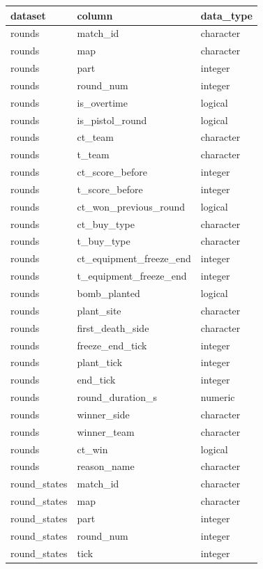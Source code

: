 \documentclass[
  letterpaper,
  DIV=11,
  numbers=noendperiod]{scrartcl}
\newcounter{none} %
\begin{document}
{\def\LTcaptype{none} %
\begin{longtable}[]{@{}lll@{}}
\toprule\noalign{}
dataset & column & data\_type \\
\midrule\noalign{}
\endhead
\bottomrule\noalign{}
\endlastfoot
rounds & match\_id & character \\
rounds & map & character \\
rounds & part & integer \\
rounds & round\_num & integer \\
rounds & is\_overtime & logical \\
rounds & is\_pistol\_round & logical \\
rounds & ct\_team & character \\
rounds & t\_team & character \\
rounds & ct\_score\_before & integer \\
rounds & t\_score\_before & integer \\
rounds & ct\_won\_previous\_round & logical \\
rounds & ct\_buy\_type & character \\
rounds & t\_buy\_type & character \\
rounds & ct\_equipment\_freeze\_end & integer \\
rounds & t\_equipment\_freeze\_end & integer \\
rounds & bomb\_planted & logical \\
rounds & plant\_site & character \\
rounds & first\_death\_side & character \\
rounds & freeze\_end\_tick & integer \\
rounds & plant\_tick & integer \\
rounds & end\_tick & integer \\
rounds & round\_duration\_s & numeric \\
rounds & winner\_side & character \\
rounds & winner\_team & character \\
rounds & ct\_win & logical \\
rounds & reason\_name & character \\
round\_states & match\_id & character \\
round\_states & map & character \\
round\_states & part & integer \\
round\_states & round\_num & integer \\
round\_states & tick & integer \\

\end{longtable}}
\end{document}
